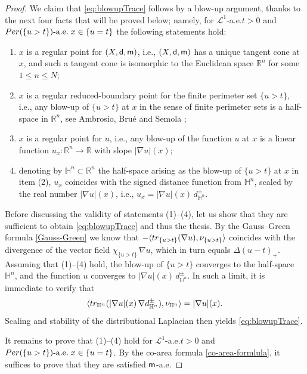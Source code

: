 \documentclass[11pt, reqno]{amsart}
\numberwithin{equation}{section}
\begin{document}
\begin{proof}
		We claim that \eqref{eq:blowupTrace} follows by a blow-up argument, thanks to the next four facts that will be proved below; namely, for $\mathcal L^1$-a.e.\;$t>0$ and ${\rm Per}(\{u>t\})\text{-a.e.}\;x\in \{u=t\}$ the following statements hold:
		\begin{enumerate}
			\item $x$ is a regular point for $(X,{\sf d}, {\sf m})$, i.e., $(X,{\sf d}, {\sf m})$ has a unique tangent cone at $x$, and such a tangent cone is isomorphic to the Euclidean space $\mathbb R^n$ for some $1\leq n\leq N$;
			\item $x$ is a regular reduced-boundary point for the finite perimeter set $\{u>t\}$, i.e., any blow-up of $\{u>t\}$ at $x$ in the sense of finite perimeter sets is a half-space in $\mathbb R^n$, see Ambrosio, Bru\'e and Semola \cite[\S3]{ABS-GAFA};
			\item $x$ is a regular point for $u$, i.e., any blow-up of the function $u$ at $x$ is a linear function $u_x:{\mathbb R}^n\to {\mathbb R}$ with slope $|\nabla u|(x) $;
			\item denoting by ${\mathbb H}^n\subset {\mathbb R}^n$ the half-space arising as the blow-up of $\{u>t\}$ at $x$ in item (2),  $u_x$ coincides with the signed distance function from ${\mathbb H}^n$, scaled by the real number $|\nabla u|(x)$, i.e., $u_x= |\nabla u| (x) \, d^{\pm}_{{\mathbb H}^n}$.
		\end{enumerate}
		Before discussing the validity of statements  (1)--(4), let us show that they are sufficient to obtain \eqref{eq:blowupTrace} and thus the thesis. By the Gauss--Green formula \eqref{Gauss-Green} we know that $-\langle {\rm tr}_{\{u>t\}}(\nabla u), \nu_{\{u>t\}} \rangle$ coincides with the divergence of the vector field $\chi_{\{u>t\}} \, \nabla u$, which in turn equals $\Delta (u-t)_+$. Assuming that (1)--(4) hold,  the blow-up of $\{u>t\}$ converges to the half-space ${\mathbb H}^n$, and the function $u$ converges to $|\nabla u|(x) \, d^{\pm}_{{\mathbb H}^n}$. In such a limit, it is immediate to verify that
		$$
		\langle {\rm tr}_{{\mathbb H}^n}(|\nabla u| (x) \, \nabla d^{\pm}_{{\mathbb H}^n}), \nu_{{\mathbb H}^n} \rangle = |\nabla u| (x).
		$$
		Scaling and stability of the distributional Laplacian then yields \eqref{eq:blowupTrace}.
		
		It remains to prove that (1)--(4) hold for $\mathcal L^1$-a.e.\;$t>0$ and ${\rm Per}(\{u>t\})\text{-a.e.}\;x\in \{u=t\}$. By the co-area formula \eqref{co-area-formlula}, it suffices to prove that they are satisfied ${\sf m}$-a.e.
		

\end{proof}
\end{document}
